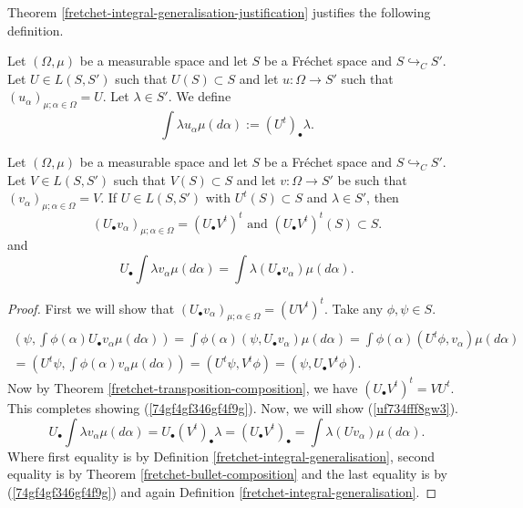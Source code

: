 \documentclass[main.tex]{subfiles}
\begin{document}
Theorem \ref{fretchet-integral-generalisation-justification} justifies the following definition.

\begin{definition}
\label{fretchet-integral-generalisation}
Let $(\Omega, \mu)$ be a measurable space and let $S$ be a Fr\'echet space and $S \hookrightarrow_C S'$. Let $U\in L(S, S')$ such that $U(S)\subset S$ and let $u:\Omega\to S'$ such that $(u_\alpha)_{\mu;\alpha\in \Omega} = U$. Let $\lambda\in S'$. We define
\begin{equation}
\int \lambda u_\alpha \mu(d\alpha) := (U^t)_\bullet\lambda.
\end{equation}
\end{definition}

\begin{theorem}
Let $(\Omega, \mu)$ be a measurable space and let $S$ be a Fr\'echet space and $S \hookrightarrow_C S'$.
Let $V\in L(S, S')$ such that $V(S) \subset S$ and let $v:\Omega \to S'$ be such that $(v_\alpha)_{\mu;\alpha\in \Omega} = V$. If  $U\in L(S, S')$ with $U^t(S) \subset S$ and $\lambda\in S'$, then
\begin{equation}
\label{74gf4gf346gf4f9g}
(U_\bullet v_\alpha)_{\mu;\alpha\in \Omega} = (U_\bullet V^t)^t \text{ and }
(U_\bullet V^t)^t(S) \subset S.
\end{equation}
and
\begin{equation}
\label{uf734fff8gw3}
U_\bullet \int \lambda v_\alpha \mu(d\alpha) = \int \lambda (U_\bullet v_\alpha) \mu(d\alpha).
\end{equation}
\end{theorem}
\begin{proof} First we will show that $(U_\bullet v_\alpha)_{\mu;\alpha\in \Omega} = (UV^t)^t$.
Take any $\phi, \psi\in S$.
\begin{multline}
\\
(\psi, \int\phi(\alpha)U_\bullet v_\alpha\mu(d\alpha)) = \int \phi(\alpha)(\psi, U_\bullet v_\alpha)\mu(d\alpha) = \int \phi(\alpha) (U^t\phi, v_\alpha)\mu(d\alpha)\\
=(U^t\psi, \int\phi(\alpha)v_\alpha \mu(d\alpha)) = (U^t\psi, V^t\phi) = (\psi, U_\bullet V^t\phi).  
\end{multline}
Now by Theorem \ref{fretchet-transposition-composition}, we have $(U_\bullet V^t)^t = VU^t$. This completes showing (\ref{74gf4gf346gf4f9g}). Now, we will show (\ref{uf734fff8gw3}).
\begin{equation}
U_\bullet \int \lambda v_\alpha \mu(d\alpha) = U_\bullet (V^t)_\bullet\lambda = (U_\bullet V^t)_\bullet = \int \lambda (U v_\alpha) \mu(d\alpha).
\end{equation}
Where first equality is by Definition \ref{fretchet-integral-generalisation}, second equality is by Theorem \ref{fretchet-bullet-composition} and the last equality is by (\ref{74gf4gf346gf4f9g}) and again Definition \ref{fretchet-integral-generalisation}.
\end{proof}
\end{document}
